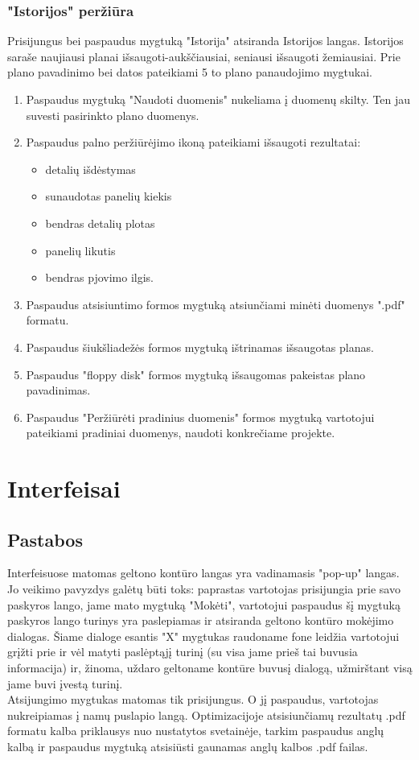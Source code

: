 \documentclass[a4paper,12pt]{article}
\begin{document}
\subsubsection{"Istorijos" peržiūra}
Prisijungus bei paspaudus mygtuką "Istorija" atsiranda Istorijos langas.
Istorijos saraše naujiausi planai išsaugoti-aukščiausiai, seniausi išsaugoti žemiausiai.
Prie plano pavadinimo bei datos pateikiami 5 to plano panaudojimo mygtukai.
\begin{enumerate}
	\item Paspaudus mygtuką "Naudoti duomenis" nukeliama į duomenų skilty.
		Ten jau suvesti pasirinkto plano duomenys.
	\item Paspaudus palno peržiūrėjimo ikoną pateikiami išsaugoti rezultatai:
		\begin{itemize}
			\item detalių išdėstymas
			\item sunaudotas panelių kiekis
			\item bendras detalių plotas
			\item panelių likutis
			\item bendras pjovimo ilgis.
		\end{itemize}
	\item Paspaudus atsisiuntimo formos mygtuką atsiunčiami minėti duomenys ".pdf" formatu.
	\item Paspaudus šiukšliadežės formos mygtuką ištrinamas išsaugotas planas.
	\item Paspaudus "floppy disk" formos mygtuką išsaugomas pakeistas plano pavadinimas.
	\item Paspaudus "Peržiūrėti pradinius duomenis" formos mygtuką vartotojui pateikiami pradiniai duomenys, naudoti konkrečiame projekte.
\end{enumerate}
\clearpage

\section{Interfeisai}

\subsection{Pastabos}
Interfeisuose matomas geltono kontūro langas yra vadinamasis "pop-up" langas. Jo veikimo pavyzdys galėtų būti toks: paprastas vartotojas prisijungia prie savo paskyros lango, jame mato mygtuką "Mokėti", vartotojui paspaudus šį mygtuką paskyros lango turinys yra paslepiamas ir atsiranda geltono kontūro mokėjimo dialogas. Šiame dialoge esantis "X" mygtukas raudoname fone leidžia vartotojui grįžti prie ir vėl matyti paslėptąjį turinį (su visa jame prieš tai buvusia informacija) ir, žinoma, uždaro geltoname kontūre buvusį dialogą, užmirštant visą jame buvi įvestą turinį.\\
Atsijungimo mygtukas matomas tik prisijungus. O jį paspaudus, vartotojas nukreipiamas į namų puslapio langą.
Optimizacijoje atsisiunčiamų rezultatų .pdf formatu kalba priklausys nuo nustatytos svetainėje, tarkim paspaudus anglų kalbą ir paspaudus mygtuką atsisiūsti gaunamas anglų kalbos .pdf failas.
\end{document}
